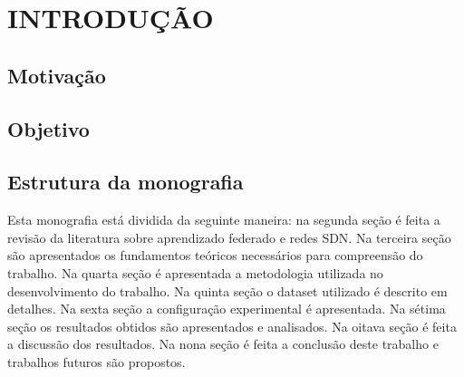 \section{INTRODUÇÃO}

\subsection{Motivação}

\subsection{Objetivo}

\subsection{Estrutura da monografia}
Esta monografia está dividida da seguinte maneira: na segunda seção é feita a revisão da literatura sobre aprendizado federado e redes SDN. Na terceira seção são apresentados os fundamentos teóricos necessários para compreensão do trabalho. Na quarta seção é apresentada a metodologia utilizada no desenvolvimento do trabalho. Na quinta seção o dataset utilizado é descrito em detalhes. Na sexta seção a configuração experimental é apresentada. Na sétima seção os resultados obtidos são apresentados e analisados. Na oitava seção é feita a discussão dos resultados. Na nona seção é feita a conclusão deste trabalho e trabalhos futuros são propostos.
